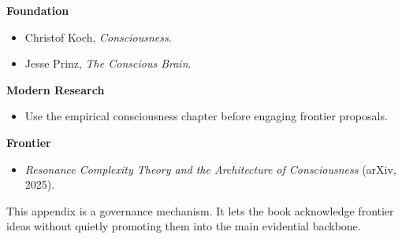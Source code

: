 \begin{readingbox}
\textbf{Foundation}
\begin{itemize}[nosep]
  \item Christof Koch, \emph{Consciousness}.
  \item Jesse Prinz, \emph{The Conscious Brain}.
\end{itemize}
\textbf{Modern Research}
\begin{itemize}[nosep]
  \item Use the empirical consciousness chapter before engaging frontier
        proposals.
\end{itemize}
\textbf{Frontier}
\begin{itemize}[nosep]
  \item \emph{Resonance Complexity Theory and the Architecture of
        Consciousness} (arXiv, 2025).
\end{itemize}
\end{readingbox}

\begin{summarybox}
This appendix is a governance mechanism. It lets the book acknowledge frontier
ideas without quietly promoting them into the main evidential backbone.
\end{summarybox}
